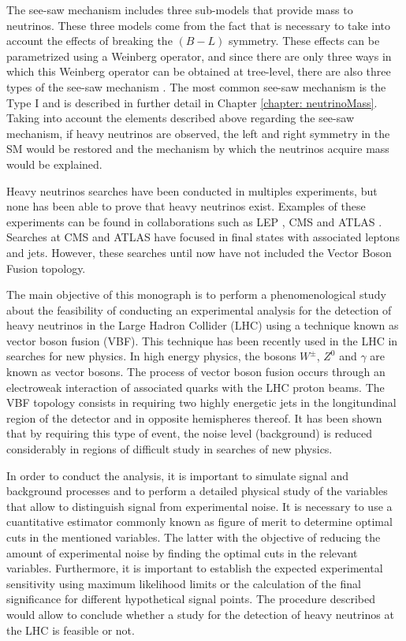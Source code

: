 The see-saw mechanism includes three sub-models that provide mass to neutrinos. These three models come from the fact that is necessary to take into account the effects of breaking the $(B-L)$ symmetry. These effects can be parametrized using a Weinberg operator, and since there are only three ways in which this Weinberg operator can be obtained at tree-level, there are also three types of the see-saw mechanism \cite{See-saw}. The most common see-saw mechanism is the Type I and is described in further detail in Chapter \ref{chapter: neutrinoMass}. Taking into account the elements described above regarding the see-saw mechanism, if heavy neutrinos are observed, the left and right symmetry in the SM would be restored and the mechanism by which the neutrinos acquire mass would be explained.

Heavy neutrinos searches have been conducted in multiples experiments, but none has been able to prove that heavy neutrinos exist. Examples of these experiments can be found in collaborations such as LEP \cite{LEP}, CMS and ATLAS \cite{CMS ATLAS}. Searches at CMS and ATLAS have focused in final states with associated leptons and jets. However, these searches until now have not included the Vector Boson Fusion topology.

The main objective of this monograph is to perform a phenomenological study about the feasibility of conducting an experimental analysis for the detection of heavy neutrinos in the Large Hadron Collider (LHC) using a technique known as vector boson fusion (VBF). This technique has been recently used in the LHC \cite{VBF Search} in searches for new physics. In high energy physics, the bosons $W^{\pm}$, $Z^{0}$ and $\gamma$ are known as vector bosons. The process of vector boson fusion occurs through an electroweak interaction of associated quarks with the LHC proton beams. The VBF topology consists in requiring two highly energetic jets in the longitundinal region of the detector and in opposite hemispheres thereof. It has been shown that by requiring this type of event, the noise level (background) is reduced considerably in regions of difficult study in searches of new physics.


In order to conduct the analysis, it is important to simulate signal and background processes and to perform a detailed physical study of the variables that allow to distinguish signal from experimental noise. It is necessary to use a cuantitative estimator commonly known as figure of merit to determine optimal cuts in the mentioned variables. The latter with the objective of reducing the amount of experimental noise by finding the optimal cuts in the relevant variables. Furthermore, it is important to establish the expected experimental sensitivity using maximum likelihood limits or the calculation of the final significance for different hypothetical signal points. The procedure described would allow to conclude whether a study for the detection of heavy neutrinos at the LHC is feasible or not.
